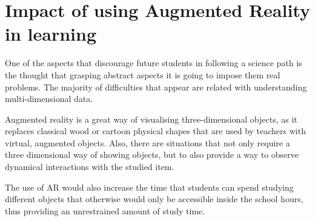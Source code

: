 \documentclass[12 pct]{report}
\begin{document}
\section{Impact of using Augmented Reality in learning}
One of the aspects that discourage future students in following a science path is the thought that grasping abstract aspects it is going to impose them real problems. The majority of difficulties that appear are related with understanding multi-dimensional data.

Augmented reality is a great way of visualising three-dimensional objects, as it replaces classical wood or cartoon physical shapes that are used by teachers with virtual, augmented objects. Also, there are situations that not only require a three dimensional way of showing objects, but to also provide a way to observe dynamical interactions with the studied item.

The use of AR would also increase the time that students can spend studying different objects that otherwise would only be accessible inside the school hours, thus providing an unrestrained amount of study time.
\end{document}
